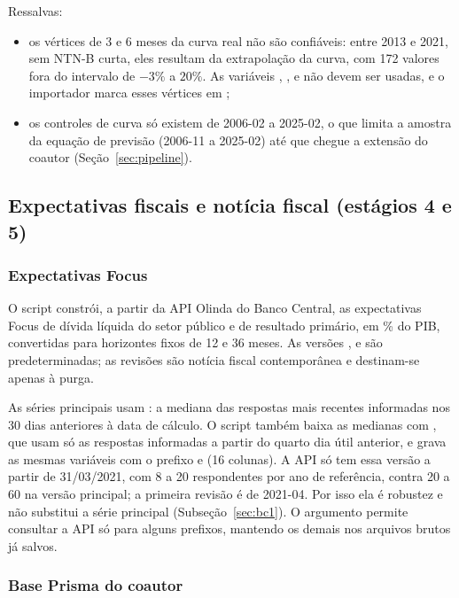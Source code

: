 \documentclass[12pt,a4paper]{article}
\begin{document}
Ressalvas:
\begin{itemize}[leftmargin=1.2cm]
    \item os vértices de 3 e 6 meses da curva real não são confiáveis: entre 2013 e
    2021, sem NTN-B curta, eles resultam da extrapolação da curva, com 172 valores
    fora do intervalo de \(-3\%\) a \(20\%\). As variáveis ,
    ,  e  não devem ser usadas, e o
    importador marca esses vértices em ;
    \item os controles de curva só existem de 2006-02 a 2025-02, o que limita a
    amostra da equação de previsão (2006-11 a 2025-02) até que chegue a extensão do
    coautor (Seção~\ref{sec:pipeline}).
\end{itemize}
\subsection{Expectativas fiscais e notícia fiscal (estágios 4 e 5)}\label{sec:fiscal_dados}

\subsubsection{Expectativas Focus}

O script  constrói, a partir da API
Olinda do Banco Central, as expectativas Focus de dívida líquida do setor público e
de resultado primário, em \% do PIB, convertidas para horizontes fixos de 12 e 36
meses. As versões ,  e  são
predeterminadas; as revisões  são notícia fiscal contemporânea e
destinam-se apenas à purga.

As séries principais usam : a mediana das respostas mais
recentes informadas nos 30 dias anteriores à data de cálculo. O
script também baixa as medianas com , que usam só as respostas
informadas a partir do quarto dia útil anterior, e grava as mesmas variáveis com o
prefixo  e  (16 colunas). A API só tem
essa versão a partir de 31/03/2021, com 8 a 20 respondentes por ano de referência,
contra 20 a 60 na versão principal; a primeira revisão é de 2021-04. Por isso ela é
robustez e não substitui a série principal (Subseção~\ref{sec:bc1}). O argumento
 permite consultar a API só para alguns prefixos, mantendo os demais
nos arquivos brutos já salvos.

\subsubsection{Base Prisma do coautor}
\end{document}
